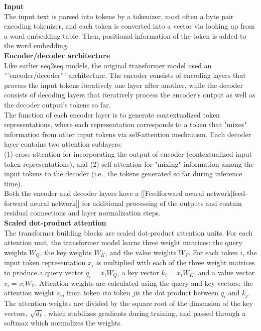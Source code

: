 \textbf{Input}\\
The input text is parsed into tokens by a tokenizer, most often a byte pair encoding tokenizer, and each token is converted into a vector via looking up from a word embedding table. Then, positional information of the token is added to the word embedding.
\\

\textbf{Encoder/decoder architecture} \\
Like earlier seq2seq models, the original transformer model used an '''encoder/decoder''' architecture. The encoder consists of encoding layers that process the input tokens iteratively one layer after another, while the decoder consists of decoding layers that iteratively process the encoder's output as well as the decoder output's tokens so far.
\\

The function of each encoder layer is to generate contextualized token representations, where each representation corresponds to a token that "mixes" information from other input tokens via self-attention mechanism. Each decoder layer contains two attention sublayers: 
\\
(1) cross-attention for incorporating the output of encoder (contextualized input token representations), and (2) self-attention for "mixing" information among the input tokens to the decoder (i.e., the tokens generated so far during inference time).
\\

Both the encoder and decoder layers have a [[Feedforward neural network|feed-forward neural network]] for additional processing of the outputs and contain residual connections and layer normalization steps.
\\

\textbf{Scaled dot-product attention} \\
The transformer building blocks are scaled dot-product attention units. For each attention unit, the transformer model learns three weight matrices: the query weights \(W_Q\), the key weights \(W_K\), and the value weights \(W_V\). For each token \(i\), the input token representation \(x_i\) is multiplied with each of the three weight matrices to produce a query vector \(q_i = x_iW_Q\), a key vector \(k_i = x_iW_K\), and a value vector \(v_i=x_iW_V\). Attention weights are calculated using the query and key vectors: the attention weight \(a_{ij}\) from token  \(i\)to token \(j\)is the dot product between \(q_i\) and \(k_j\). The attention weights are divided by the square root of the dimension of the key vectors, \(\sqrt{d_k}\), which stabilizes gradients during training, and passed through a softmax which normalizes the weights.
\\

